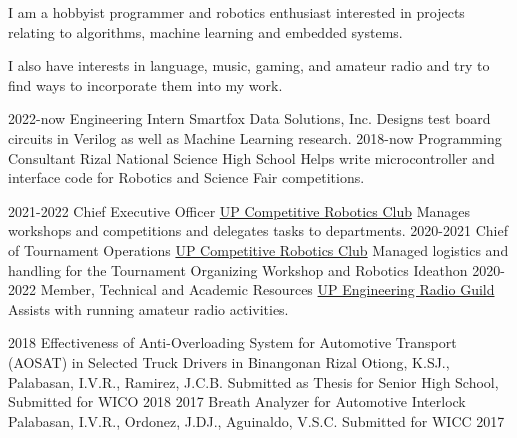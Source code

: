 \documentclass[9pt]{developercv}
\begin{document}
\begin{minipage}[t]{0.475\textwidth} 
	\vspace{-\baselineskip}

	I am a hobbyist programmer and robotics enthusiast interested in projects relating to algorithms, machine learning and embedded systems.

	I also have interests in language, music, gaming, and amateur radio and try to find ways to incorporate them into my work.


	\begin{entrylist}
		\entry
			{2022-now}
			{Engineering Intern}
			{Smartfox Data Solutions, Inc.}
			{Designs test board circuits in Verilog as well as Machine Learning research.}	
		\entry
			{2018-now}
			{Programming Consultant}
			{Rizal National Science High School}
			{Helps write microcontroller and interface code for Robotics and Science Fair competitions. }
	\end{entrylist}
	\cvsect{Organizations}
	\begin{entrylist}
		\entry
			{2021-2022}
			{Chief Executive Officer}
			{\href{https://upcrc.org}{UP Competitive Robotics Club}}
			{Manages workshops and competitions and delegates tasks to departments.}
		\entry
			{2020-2021}
			{Chief of Tournament Operations}
			{\href{https://upcrc.org}{UP Competitive Robotics Club}}
			{Managed logistics and handling for the Tournament Organizing Workshop and Robotics Ideathon}
		\entry
			{2020-2022}
			{Member, Technical and Academic Resources}
			{\href{https://up-erg.org}{UP Engineering Radio Guild}}
			{Assists with running amateur radio activities.}
	\end{entrylist}
	\cvsect{Publications}
	\begin{entrylist}
		\entry
			{2018}
			{Effectiveness of Anti-Overloading System for Automotive Transport (AOSAT) in Selected Truck Drivers in Binangonan Rizal}
			{Otiong, K.SJ., Palabasan, I.V.R., Ramirez, J.C.B.}
			{Submitted as Thesis for Senior High School, Submitted for WICO 2018}
		\entry
			{2017}
			{Breath Analyzer for Automotive Interlock}
			{Palabasan, I.V.R., Ordonez, J.DJ., Aguinaldo, V.S.C.}
			{Submitted for WICC 2017}
	\end{entrylist}

\end{minipage}
\hfill 
\end{document}
